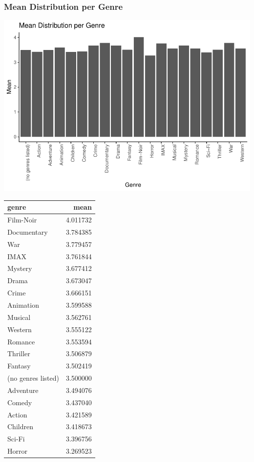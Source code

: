 \documentclass[]{article}
\begin{document}
\hypertarget{mean-distribution-per-genre}{%
\subsubsection{Mean Distribution per
Genre}\label{mean-distribution-per-genre}}

\begin{center}\includegraphics{MovieLens_Project_Report_files/figure-latex/unnamed-chunk-28-1} \end{center}

\begin{table}[H]
\centering\begingroup\fontsize{10}{12}\selectfont

\begin{tabular}{l|r}
\hline
genre & mean\\
\hline
Film-Noir & 4.011732\\
\hline
Documentary & 3.784385\\
\hline
War & 3.779457\\
\hline
IMAX & 3.761844\\
\hline
Mystery & 3.677412\\
\hline
Drama & 3.673047\\
\hline
Crime & 3.666151\\
\hline
Animation & 3.599588\\
\hline
Musical & 3.562761\\
\hline
Western & 3.555122\\
\hline
Romance & 3.553594\\
\hline
Thriller & 3.506879\\
\hline
Fantasy & 3.502419\\
\hline
(no genres listed) & 3.500000\\
\hline
Adventure & 3.494076\\
\hline
Comedy & 3.437040\\
\hline
Action & 3.421589\\
\hline
Children & 3.418673\\
\hline
Sci-Fi & 3.396756\\
\hline
Horror & 3.269523\\
\hline
\end{tabular}
\endgroup{}
\end{table}
\end{document}
